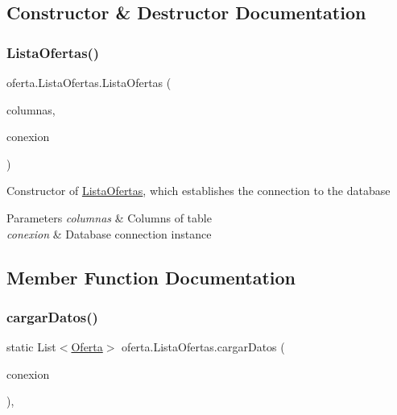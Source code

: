 \subsection{Constructor \& Destructor Documentation}
\mbox{\label{classoferta_1_1_lista_ofertas_a2af761366b995c4ddf7cb6b1175de314}} 
\subsubsection{\texorpdfstring{Lista\+Ofertas()}{ListaOfertas()}}
{\footnotesize\ttfamily oferta.\+Lista\+Ofertas.\+Lista\+Ofertas (\begin{DoxyParamCaption}\item[{\mbox{\hyperlink{classoferta_1_1_modelo_columnas_tabla_oferta}{Modelo\+Columnas\+Tabla\+Oferta}}}]{columnas,  }\item[{\mbox{\hyperlink{classconexion_s_q_l_1_1_my_data_access}{My\+Data\+Access}}}]{conexion }\end{DoxyParamCaption})\hspace{0.3cm}{\ttfamily [inline]}}

Constructor of \mbox{\hyperlink{classoferta_1_1_lista_ofertas}{Lista\+Ofertas}}, which establishes the connection to the database 
\begin{DoxyParams}{Parameters}
{\em columnas} & Columns of table \\
\hline
{\em conexion} & Database connection instance \\
\hline
\end{DoxyParams}


\subsection{Member Function Documentation}
\mbox{\label{classoferta_1_1_lista_ofertas_a7ad03e98699edb0253f41109273e350e}} 
\subsubsection{\texorpdfstring{cargar\+Datos()}{cargarDatos()}}
{\footnotesize\ttfamily static List$<$\mbox{\hyperlink{classoferta_1_1_oferta}{Oferta}}$>$ oferta.\+Lista\+Ofertas.\+cargar\+Datos (\begin{DoxyParamCaption}\item[{\mbox{\hyperlink{classconexion_s_q_l_1_1_my_data_access}{My\+Data\+Access}}}]{conexion }\end{DoxyParamCaption})\hspace{0.3cm}{\ttfamily [inline]}, {\ttfamily [static]}}

